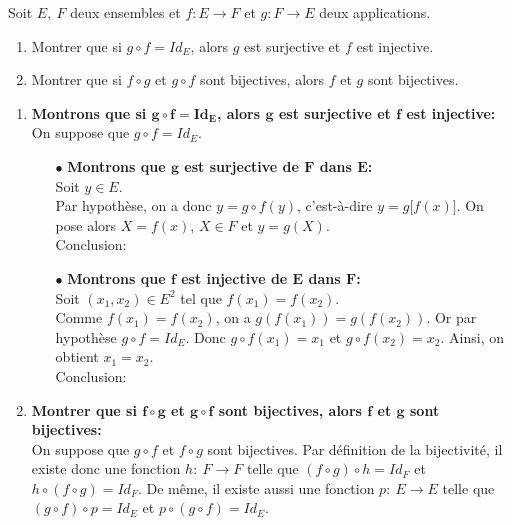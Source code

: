 \documentclass[a4paper, 11pt,reqno]{article}
\begin{document}
\begin{exercice}   \;
	Soit $E,\ F$ deux ensembles et $f: E\rightarrow F$ et $g: F\rightarrow E$ deux applications.
	\begin{enumerate}
		\item
		      Montrer que si $g\circ f=Id_E$, alors $g$ est surjective et $f$ est injective.
		\item
		      Montrer que si $f\circ g$ et $g\circ f$ sont bijectives, alors $f$ et $g$ sont bijectives.
	\end{enumerate}
\end{exercice}
\begin{correction} \;
	\begin{enumerate}
		\item \textbf{Montrons que si $\mathbf{g\circ f=Id_E}$, alors $\mathbf{g}$ est surjective et $\mathbf{f}$ est injective:}\\
		      \noindent On suppose que $g\circ f=Id_E$.\\
		      \begin{itemize}
			      \item[$\bullet$] \textbf{Montrons que $\mathbf{g}$ est surjective de $\mathbf{F}$ dans $\mathbf{E}$:}\\
				      \noindent Soit $y\in E$.\\
				      Par hypoth\`ese, on a donc $y=g\circ f(y)$, c'est-\`a-dire $y=g\lbrack f(x)\rbrack$. On pose alors $X=f(x)$, $X\in F$ et $y=g(X)$.\\
				      \noindent Conclusion: 
			      \item[$\bullet$] \textbf{Montrons que $\mathbf{f}$ est injective de $\mathbf{E}$ dans $\mathbf{F}$:}\\
				      \noindent Soit $(x_1,x_2)\in E^2$ tel que $f(x_1)=f(x_2)$. \\
				      \noindent Comme $f(x_1)=f(x_2)$, on a $g(f(x_1))=g(f(x_2))$. Or par hypoth\`ese $g\circ f=Id_E$. Donc $g\circ f(x_1)=x_1$ et $g\circ f(x_2)=x_2$. Ainsi, on obtient $x_1=x_2$.\\
				      \noindent Conclusion: 
		      \end{itemize}
		\item \textbf{Montrer que si $\mathbf{f\circ g}$ et $\mathbf{g\circ f}$ sont bijectives, alors $\mathbf{f}$ et $\mathbf{g}$ sont bijectives:}\\
		      \noindent On suppose que $g\circ f$ et $f\circ g$ sont bijectives. Par d\'efinition de la bijectivit\'e, il existe donc une fonction $h:\ F\rightarrow F$ telle que  $(f\circ g)\circ h=Id_F$ et $h\circ (f\circ g)=Id_F$. De m\^eme, il existe aussi une fonction $p:\ E\rightarrow E$ telle que $(g\circ f)\circ p=Id_E$ et $p\circ (g\circ f)=Id_E$. \\

\end{enumerate}
\end{correction}
\end{document}
